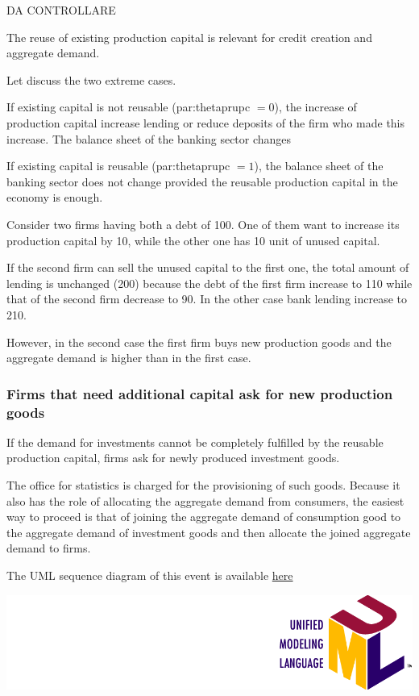 \documentclass{book}
\newcommand{\doclocation}{file:///Users/giulioni/Documents/workspace/gabriele/docs}
\begin{document}
DA CONTROLLARE

The reuse of existing production capital is relevant for credit creation and aggregate demand.

Let discuss the two extreme cases.

If existing capital is not reusable (\gls{par:thetaprupc} $=0$), the increase of production capital increase lending or reduce deposits of the firm who made this increase. The balance sheet of the banking sector changes

If existing capital is reusable (\gls{par:thetaprupc} $=1$), the balance sheet of the banking sector does not change provided the reusable production capital in the economy is enough.

Consider two firms having both a debt of 100. One of them want to increase its production capital by 10, while the other one has 10 unit of unused capital. 

If the second firm can sell the unused capital to the first one, the total amount of lending is unchanged (200) because the debt of the first firm increase to 110 while that of the second firm decrease to 90.
In the other case bank lending increase to 210.

However, in the second case the first firm buys new production goods and the aggregate demand is higher than in the first case. 

\fi

\subsubsection{Firms that need additional capital ask for new production goods}

If the demand for investments cannot be completely fulfilled by the reusable production capital, firms ask for newly produced investment goods. 

The office for statistics is charged for the  provisioning of such goods. Because it also has the role of allocating the aggregate demand from consumers, the easiest way to proceed is that of joining the aggregate demand of consumption good to the aggregate demand of investment goods and then allocate the joined aggregate demand to firms.

\vskip3mm
The UML sequence diagram of this event is available \href{\doclocation/umldoc/allocateInvestments.html}{here}
\begin{marginfigure}
	\includegraphics[scale=0.1]{uml.png}
\end{marginfigure}
\end{document}
